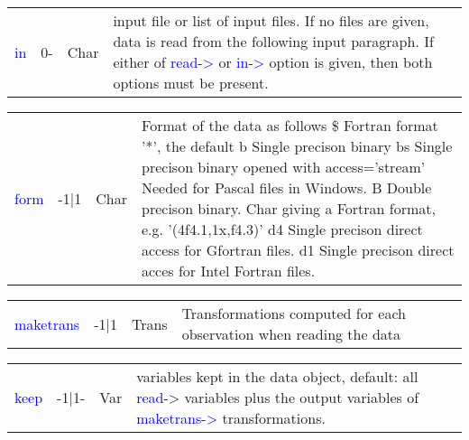 \vspace{-1.51em}
\begin{table}[H]
\begin{tabular}{ m{}  m{}m{}p{}}
 \textcolor{blue}{in} &0-&Char&input file or list of input files. If no files are given, data is read from the following input
 paragraph. If either of \textcolor{blue}{read->} or \textcolor{blue}{in->} option is given, then both options must
 be present.
\\ \cline{1-4}
\end{tabular}
\end{table}
\vspace{-1.51em}
\begin{table}[H]
\begin{tabular}{ m{}  m{}m{}p{}}
 \textcolor{blue}{form} &-1|1&Char& Format of the data as follows \newline
 \$  Fortran format '*', the default \newline
 b    Single precison binary \newline
bs  Single precison binary opened with access='stream'
 Needed for Pascal files in Windows. \newline
 B  Double precison binary.\newline
 Char giving a Fortran format, e.g. '(4f4.1,1x,f4.3)' \newline
 d4 Single precison direct access for Gfortran files.\newline
 d1 Single precison direct acces for Intel Fortran files.
\\ \cline{1-4}
\end{tabular}
\end{table}
\vspace{-1.51em}
\begin{table}[H]
\begin{tabular}{ m{}  m{}m{}p{}}
 \textcolor{blue}{maketrans}&-1|1&Trans &Transformations computed for each observation when reading the data


\\ \cline{1-4}
\end{tabular}
\end{table}
\vspace{-1.51em}
\begin{table}[H]
\begin{tabular}{ m{}  m{}m{}p{}}
 \textcolor{blue}{keep}&-1|1-&Var& variables kept in the data object, default: all \textcolor{blue}{read}-> variables plus the output
 variables of \textcolor{blue}{maketrans->} transformations.

\\ \cline{1-4}
\end{tabular}
\end{table}

